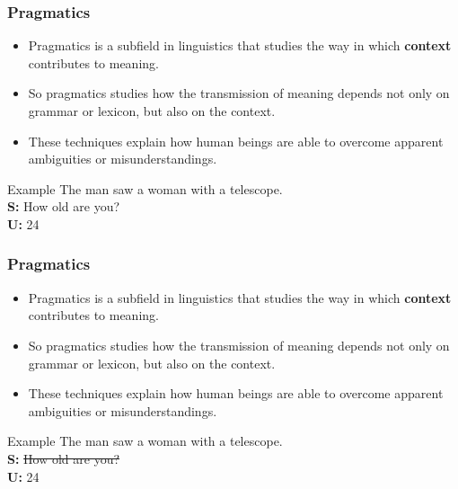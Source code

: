 \documentclass[11pt]{beamer}
\begin{document}
\begin{frame}
\frametitle{Pragmatics}
	\begin{itemize}
		\item Pragmatics is a subfield in linguistics that studies the way in which \textbf{context} contributes to meaning.
		\item So pragmatics studies how the transmission of meaning depends not only on grammar or lexicon, but also on the context.
		\item These techniques explain how human beings are able to overcome apparent ambiguities or misunderstandings.
	\end{itemize}
	\pause
	\begin{block}{Example}
		\vspace{10pt}
		The man saw a woman with a telescope.\\
		\vspace{10pt}
		\pause
		\textbf{S:} How old are you?\\
		\textbf{U:} 24  \\
		\vspace{10pt}
	\end{block}
\end{frame}

\begin{frame}[noframenumbering]
\frametitle{Pragmatics}
	\begin{itemize}
		\item Pragmatics is a subfield in linguistics that studies the way in which \textbf{context} contributes to meaning.
		\item So pragmatics studies how the transmission of meaning depends not only on grammar or lexicon, but also on the context.
		\item These techniques explain how human beings are able to overcome apparent ambiguities or misunderstandings.
	\end{itemize}
	\begin{block}{Example}
		\vspace{10pt}
		The man saw a woman with a telescope.\\
		\vspace{10pt}
		\textbf{S:} \st{How old are you?}\\
		\textbf{U:} 24 \\
		\vspace{10pt}
	\end{block}
\end{frame}
\end{document}
